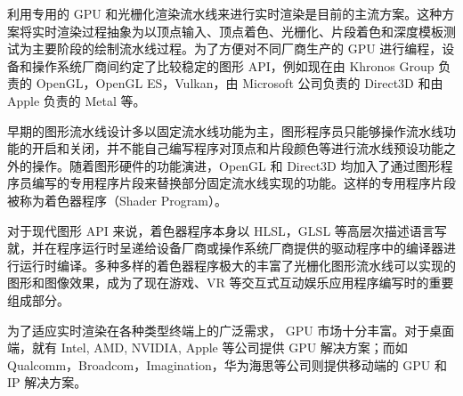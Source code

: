 利用专用的 GPU 和光栅化渲染流水线来进行实时渲染是目前的主流方案。这种方案将实时渲染过程抽象为以顶点输入、顶点着色、光栅化、片段着色和深度模板测试为主要阶段的绘制流水线过程。为了方便对不同厂商生产的 GPU 进行编程，设备和操作系统厂商间约定了比较稳定的图形 API，例如现在由 Khronos Group 负责的 OpenGL\cite{OpenGLSpec}，OpenGL ES\cite{OpenGLESSpec}，Vulkan\cite{VulkanSpec}，由 Microsoft 公司负责的 Direct3D\cite{Direct3DSpec} 和由 Apple 负责的 Metal\cite{MetalSpec} 等。


早期的图形流水线设计多以固定流水线功能为主，图形程序员只能够操作流水线功能的开启和关闭，并不能自己编写程序对顶点和片段颜色等进行流水线预设功能之外的操作。随着图形硬件的功能演进，OpenGL 和 Direct3D 均加入了通过图形程序员编写的专用程序片段来替换部分固定流水线实现的功能。这样的专用程序片段被称为着色器程序（Shader Program）。

对于现代图形 API 来说，着色器程序本身以 HLSL，GLSL 等高层次描述语言写就，并在程序运行时呈递给设备厂商或操作系统厂商提供的驱动程序中的编译器进行运行时编译。多种多样的着色器程序极大的丰富了光栅化图形流水线可以实现的图形和图像效果，成为了现在游戏、VR 等交互式互动娱乐应用程序编写时的重要组成部分。

为了适应实时渲染在各种类型终端上的广泛需求， GPU 市场十分丰富。对于桌面端，就有 Intel, AMD, NVIDIA, Apple 等公司提供 GPU 解决方案；而如 Qualcomm，Broadcom，Imagination，华为海思等公司则提供移动端的 GPU 和 IP 解决方案。

